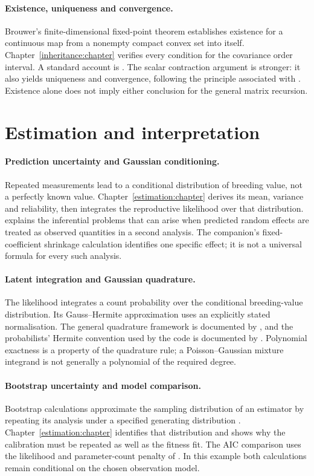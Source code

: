 \paragraph{Existence, uniqueness and convergence.}
Brouwer's finite-dimensional fixed-point theorem establishes existence for a continuous map from a nonempty compact convex set into itself. Chapter~\ref{inheritance:chapter} verifies every condition for the covariance order interval. A standard account is \citet{GranasDugundji2003}. The scalar contraction argument is stronger: it also yields uniqueness and convergence, following the principle associated with \citet{Banach1922}. Existence alone does not imply either conclusion for the general matrix recursion.

\section{Estimation and interpretation}

\paragraph{Prediction uncertainty and Gaussian conditioning.}
Repeated measurements lead to a conditional distribution of breeding value, not a perfectly known value. Chapter~\ref{estimation:chapter} derives its mean, variance and reliability, then integrates the reproductive likelihood over that distribution. \citet{HadfieldEtAl2010} explains the inferential problems that can arise when predicted random effects are treated as observed quantities in a second analysis. The companion's fixed-coefficient shrinkage calculation identifies one specific effect; it is not a universal formula for every such analysis.

\paragraph{Latent integration and Gaussian quadrature.}
The likelihood integrates a count probability over the conditional breeding-value distribution. Its Gauss--Hermite approximation uses an explicitly stated normalisation. The general quadrature framework is documented by \citet{NISTDLMF}, and the probabilists' Hermite convention used by the code is documented by \citet{SciPyHermite}. Polynomial exactness is a property of the quadrature rule; a Poisson--Gaussian mixture integrand is not generally a polynomial of the required degree.

\paragraph{Bootstrap uncertainty and model comparison.}
Bootstrap calculations approximate the sampling distribution of an estimator by repeating its analysis under a specified generating distribution \citep{Efron1979}. Chapter~\ref{estimation:chapter} identifies that distribution and shows why the calibration must be repeated as well as the fitness fit. The AIC comparison uses the likelihood and parameter-count penalty of \citet{Akaike1974}. In this example both calculations remain conditional on the chosen observation model.

